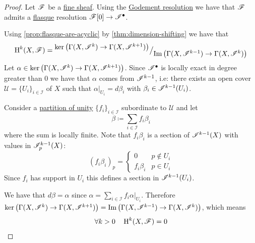 \documentclass[../../main]{subfiles}
\begin{document}
\begin{proof}
  Let \(\mathscr{F}\) be a \hyperref[def:fine-sheaf]{fine sheaf}.
  Using the \hyperref[def:godement-resolution]{Godement resolution} we have that \(\mathscr{F}\) admits a \hyperref[def:flasque-sheaf]{flasque} resolution \(\mathscr{F}[0] \to \mathscr{I}^{\bullet}\).

  Using \autoref{prop:flasque-are-acyclic} by \autoref{thm:dimension-shifting} we have that
  \begin{equation*}
    \operatorname{H}^{k}(X, \mathscr{F}) = {^{\textstyle \ker\left( \Gamma(X, \mathscr{I}^{k}) \to \Gamma(X, \mathscr{I}^{k+1}) \right)}\big/_{\textstyle \operatorname*{Im} \left( \Gamma(X, \mathscr{I}^{k-1}) \to \Gamma(X, \mathscr{I}^{k}) \right)}}
  \end{equation*}
  Let \(\alpha \in \ker\left( \Gamma(X, \mathscr{I}^{k}) \to \Gamma(X, \mathscr{I}^{k+1}) \right)\).
  Since \(\mathscr{I}^{\bullet}\) is locally exact in degree greater than 0 we have that \(\alpha\) comes from \(\mathscr{I}^{k-1}\), i.e: there exists an open cover \(\mathscr{U} = \{U_{i}\}_{i \in \mathcal{I}}\) of \(X\) such that \(\alpha|_{U_{i}} = d\beta_{i}\) with \(\beta_{i} \in \mathscr{I}^{k-1}(U_{i})\).

  Consider a \hyperref[def:partition-of-unity]{partition of unity} \(\{f_{i}\}_{i \in \mathcal{I}}\) subordinate to \(\mathscr{U}\) and let
  \begin{equation*}
    \beta \coloneq \sum_{i \in \mathcal{I}} f_{i}\beta_{i}
  \end{equation*}
  where the sum is locally finite.
  Note that \(f_{i}\beta_{i}\) is a section of \(\mathscr{I}^{k-1}(X)\) with values in \(\mathscr{I}_{p}^{k-1}(X)\):
  \begin{equation*}
    (f_{i}\beta_{i})_{p} = \begin{cases}
      0 & p \notin U_{i} \\
      f_{i}\beta_{i} & p \in U_{i}
    \end{cases}
  \end{equation*}
  Since \(f_{i}\) has support in \(U_{i}\) this defines a section in \(\mathscr{I}^{k-1}(U_{i})\).

  We have that \(d\beta = \alpha\) since \(\alpha = \sum_{i \in \mathcal{I}} f_{i}\alpha|_{U_{i}}\).
  Therefore \(\ker\left( \Gamma(X, \mathscr{I}^{k}) \to \Gamma(X, \mathscr{I}^{k+1}) \right) = \operatorname*{Im} \left( \Gamma(X, \mathscr{I}^{k-1}) \to \Gamma(X, \mathscr{I}^{k}) \right)\), which means
  \begin{equation*}
    \forall k > 0 \quad \operatorname{H}^{k}(X, \mathscr{F}) = 0
  \end{equation*}
\end{proof}
\end{document}
